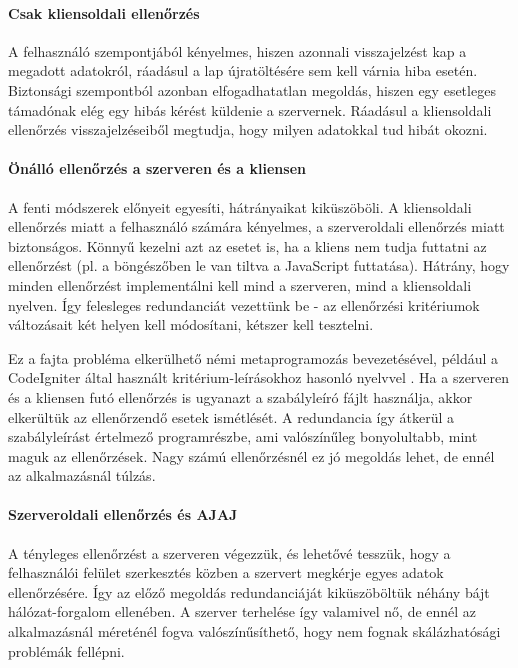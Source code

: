 \documentclass[12pt,a4paper,twoside]{article}
\begin{document}
\paragraph{Csak kliensoldali ellenőrzés}
A felhasználó szempontjából kényelmes, hiszen azonnali visszajelzést kap a
megadott adatokról, ráadásul a lap újratöltésére sem kell várnia hiba
esetén. Biztonsági szempontból azonban elfogadhatatlan megoldás, hiszen egy
esetleges támadónak elég egy hibás kérést küldenie a szervernek. Ráadásul a
kliensoldali ellenőrzés visszajelzéseiből megtudja, hogy milyen adatokkal tud
hibát okozni.

\paragraph{Önálló ellenőrzés a szerveren és a kliensen}
A fenti módszerek előnyeit egyesíti, hátrányaikat kiküszöböli. A kliensoldali
ellenőrzés miatt a felhasználó számára kényelmes, a szerveroldali ellenőrzés
miatt biztonságos. Könnyű kezelni azt az esetet is, ha a kliens nem tudja
futtatni az ellenőrzést (pl. a böngészőben le van tiltva a JavaScript
futtatása). Hátrány, hogy minden ellenőrzést implementálni kell mind
a szerveren, mind a kliensoldali nyelven. Így felesleges redundanciát vezettünk
be - az ellenőrzési kritériumok változásait két helyen kell módosítani, kétszer
kell tesztelni.

Ez a fajta probléma elkerülhető némi metaprogramozás bevezetésével, például a
CodeIgniter által használt kritérium-leírásokhoz hasonló nyelvvel
\cite{CI-Val}. Ha a szerveren és a kliensen futó ellenőrzés is ugyanazt a
szabályleíró fájlt használja, akkor elkerültük az ellenőrzendő esetek
ismétlését. A redundancia így átkerül a szabályleírást értelmező programrészbe,
ami valószínűleg bonyolultabb, mint maguk az ellenőrzések. Nagy számú
ellenőrzésnél ez jó megoldás lehet, de ennél az alkalmazásnál túlzás.

\paragraph{Szerveroldali ellenőrzés és AJAJ\cite{AJAJ}}
A tényleges ellenőrzést a szerveren végezzük, és lehetővé tesszük, hogy a
felhasználói felület szerkesztés közben a szervert megkérje egyes adatok
ellenőrzésére. Így az előző megoldás redundanciáját kiküszöböltük néhány bájt
hálózat-forgalom ellenében. A szerver terhelése így valamivel nő, de ennél az
alkalmazásnál méreténél fogva valószínűsíthető, hogy nem fognak skálázhatósági
problémák fellépni.
\end{document}
